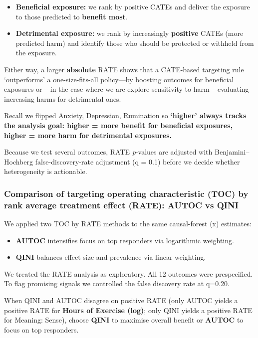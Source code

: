 \documentclass[
  single column]{article}
\providecommand{\tightlist}{%
  \setlength{\itemsep}{0pt}\setlength{\parskip}{0pt}}
\begin{document}
\begin{itemize}
\tightlist
\item
  \textbf{Beneficial exposure:} we rank by positive CATEs and deliver
  the exposure to those predicted to \textbf{benefit most}.
\item
  \textbf{Detrimental exposure:} we rank by increasingly
  \textbf{positive} CATEs (more predicted harm) and identify those who
  should be protected or withheld from the exposure.
\end{itemize}

Either way, a larger \textbf{absolute} RATE shows that a CATE-based
targeting rule `outperforms' a one-size-fits-all policy---by boosting
outcomes for beneficial exposures or -- in the case where we are explore
sensitivity to harm -- evaluating increasing harms for detrimental ones.

Recall we flipped Anxiety, Depression, Rumination so \textbf{`higher'
always tracks the analysis goal: higher = more benefit for beneficial
exposures, higher = more harm for detrimental exposures.}

Because we test several outcomes, RATE \emph{p}-values are adjusted with
Benjamini--Hochberg false-discovery-rate adjustment (q = 0.1) before we
decide whether heterogeneity is actionable.

\subsubsection{Comparison of targeting operating characteristic (TOC) by
rank average treatment effect (RATE): AUTOC vs
QINI}\label{comparison-of-targeting-operating-characteristic-toc-by-rank-average-treatment-effect-rate-autoc-vs-qini}

We applied two TOC by RATE methods to the same causal-forest \tau(x)
estimates:

\begin{itemize}
\item
  \textbf{AUTOC} intensifies focus on top responders via logarithmic
  weighting.
\item
  \textbf{QINI} balances effect size and prevalence via linear
  weighting.
\end{itemize}

We treated the RATE analysis as exploratory. All 12 outcomes were
prespecified. To flag promising signals we controlled the false
discovery rate at q=0.20.

When QINI and AUTOC disagree on positive RATE (only AUTOC yields a
positive RATE for \textbf{Hours of Exercise (log)}; only QINI yields a
positive RATE for Meaning: Sense), choose \textbf{QINI} to maximise
overall benefit or \textbf{AUTOC} to focus on top responders.
\end{document}
